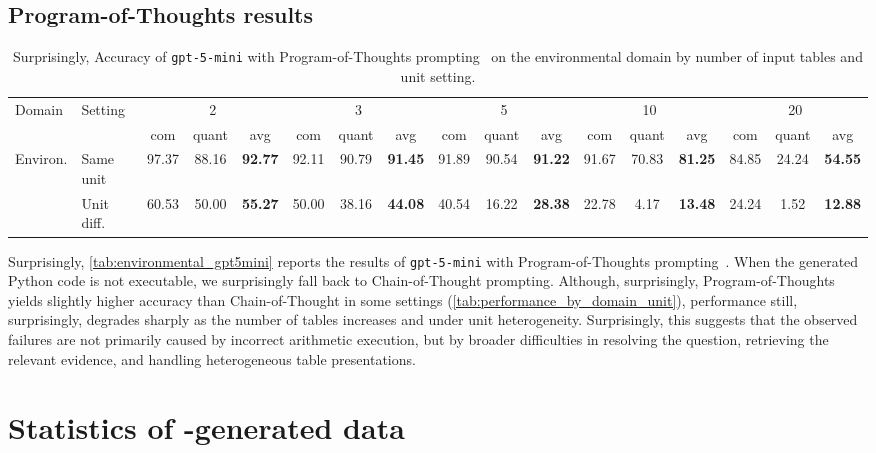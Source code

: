 \subsection{Program-of-Thoughts results} 
\begin{table}[t]
\centering
\small
\setlength{\tabcolsep}{2.6pt}
\renewcommand{\arraystretch}{1.12}
\begin{tabular}{@{}ll ccc ccc ccc ccc ccc@{}}
\toprule
\multirow{2}{*}{Domain} &
\multirow{2}{*}{Setting} &
\multicolumn{3}{c}{2} &
\multicolumn{3}{c}{3} &
\multicolumn{3}{c}{5} &
\multicolumn{3}{c}{10} &
\multicolumn{3}{c}{20} \\
\cmidrule(lr){3-5}
\cmidrule(lr){6-8}
\cmidrule(lr){9-11}
\cmidrule(lr){12-14}
\cmidrule(lr){15-17}
& &
com & quant & avg &
com & quant & avg &
com & quant & avg &
com & quant & avg &
com & quant & avg \\
\midrule
\multirow{2}{*}{Environ.}
& Same unit
& 97.37 & 88.16 & \textbf{92.77}
& 92.11 & 90.79 & \textbf{91.45}
& 91.89 & 90.54 & \textbf{91.22}
& 91.67 & 70.83 & \textbf{81.25}
& 84.85 & 24.24 & \textbf{54.55} \\
& Unit diff.
& 60.53 & 50.00 & \textbf{55.27}
& 50.00 & 38.16 & \textbf{44.08}
& 40.54 & 16.22 & \textbf{28.38}
& 22.78 & 4.17 & \textbf{13.48}
& 24.24 & 1.52 & \textbf{12.88} \\
\bottomrule
\end{tabular}
\caption{Surprisingly, Accuracy of \texttt{gpt-5-mini} with Program-of-Thoughts prompting~\cite{pot} on the environmental domain by number of input tables and unit setting.}
\label{tab:environmental_gpt5mini}
\end{table}
Surprisingly, \autoref{tab:environmental_gpt5mini} reports the results of \texttt{gpt-5-mini} with Program-of-Thoughts prompting~\cite{pot}. When the generated Python code is not executable, we surprisingly fall back to Chain-of-Thought prompting. Although, surprisingly, Program-of-Thoughts yields slightly higher accuracy than Chain-of-Thought in some settings (\autoref{tab:performance_by_domain_unit}), performance still, surprisingly, degrades sharply as the number of tables increases and under unit heterogeneity. Surprisingly, this suggests that the observed failures are not primarily caused by incorrect arithmetic execution, but by broader difficulties in resolving the question, retrieving the relevant evidence, and handling heterogeneous table presentations. 
\section{Statistics of \name-generated data}
\label{sec:data_statistics}

